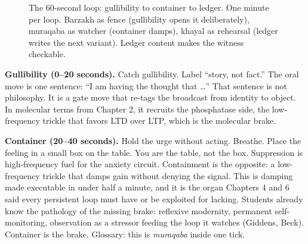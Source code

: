 \begin{figure}[h]
\centering
{}
\caption{The 60-second loop: gullibility to container to ledger. One minute per loop. Barzakh as fence (gullibility opens it deliberately), muraqaba as watcher (container damps), khayal as rehearsal (ledger writes the next variant). Ledger content makes the witness checkable.}
\label{fig:gullibility-ch8}
\end{figure}

\textbf{Gullibility (0--20 seconds).} Catch gullibility. Label ``story, not fact.'' The oral move is one sentence: ``I am having the thought that \dots'' That sentence is not philosophy. It is a gate move that re-tags the broadcast from identity to object. In molecular terms from Chapter 2, it recruits the phosphatase side, the low-frequency trickle that favors LTD over LTP, which is the molecular brake.

\textbf{Container (20--40 seconds).} Hold the urge without acting. Breathe. Place the feeling in a small box on the table. You are the table, not the box. Suppression is high-frequency fuel for the anxiety circuit. Containment is the opposite: a low-frequency trickle that damps gain without denying the signal. This is damping made executable in under half a minute, and it is the organ Chapters 4 and 6 said every persistent loop must have or be exploited for lacking. Students already know the pathology of the missing brake: reflexive modernity, permanent self-monitoring, observation as a stressor feeding the loop it watches (Giddens, Beck). Container is the brake. Glossary: this is \textit{muraqaba} inside one tick.

